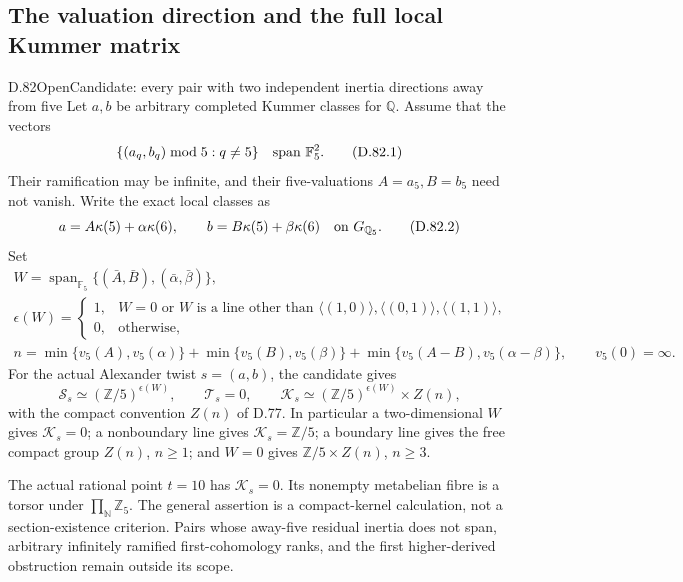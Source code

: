 \subsection{The valuation direction and the full local Kummer matrix}

\begin{statement}{D.82}{Open}{Candidate: every pair with two independent inertia directions away from five}
Let \(a,b\) be arbitrary completed Kummer classes for \(\mathbb Q\).
Assume that the vectors
\[
             \{(a_q,b_q)\bmod5:q\ne5\}
                         \quad\hbox{span }\mathbb F_5^2.
                                                               \tag{D.82.1}
\]
Their ramification may be infinite, and their five-valuations
\(A=a_5,B=b_5\) need not vanish. Write the exact local classes as
\[
 a=A\kappa(5)+\alpha\kappa(6),\qquad
 b=B\kappa(5)+\beta\kappa(6)
                         \quad\hbox{on }G_{\mathbb Q_5}.
                                                               \tag{D.82.2}
\]
Set
\[
 \begin{gathered}
 W=\operatorname{span}_{\mathbb F_5}
       \{(\bar A,\bar B),(\bar\alpha,\bar\beta)\},\\
 \epsilon(W)=
 \begin{cases}
  1,&W=0\text{ or }W\text{ is a line other than }
       \langle(1,0)\rangle,\langle(0,1)\rangle,\langle(1,1)\rangle,\\
  0,&\text{otherwise},
 \end{cases}\\
 n=\min\{v_5(A),v_5(\alpha)\}
   +\min\{v_5(B),v_5(\beta)\}
   +\min\{v_5(A-B),v_5(\alpha-\beta)\},
 \qquad v_5(0)=\infty .
 \end{gathered}                                               \tag{D.82.3}
\]
For the actual Alexander twist \(s=(a,b)\), the candidate gives
\[
 \mathcal S_s\simeq(\mathbb Z/5)^{\epsilon(W)},\qquad
 \mathcal T_s=0,\qquad
 \mathcal K_s\simeq(\mathbb Z/5)^{\epsilon(W)}\times Z(n),
                                                               \tag{D.82.4}
\]
with the compact convention \(Z(n)\) of D.77.
In particular a two-dimensional \(W\) gives
\(\mathcal K_s=0\); a nonboundary line gives
\(\mathcal K_s=\mathbb Z/5\); a boundary line gives the free
compact group \(Z(n)\), \(n\ge1\); and \(W=0\) gives
\(\mathbb Z/5\times Z(n)\), \(n\ge3\).

The actual rational point \(t=10\) has \(\mathcal K_s=0\).
Its nonempty metabelian fibre is a torsor under
\(\prod_{\mathbb N}\mathbb Z_5\).
The general assertion is a compact-kernel calculation,
not a section-existence criterion. Pairs whose away-five residual inertia does not span,
arbitrary infinitely ramified first-cohomology
ranks, and the first higher-derived obstruction remain outside
its scope.
\end{statement}

